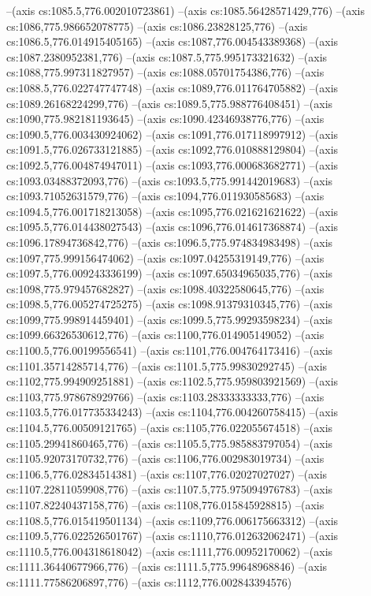 --(axis cs:1085.5,776.002010723861)
--(axis cs:1085.56428571429,776)
--(axis cs:1086,775.986652078775)
--(axis cs:1086.23828125,776)
--(axis cs:1086.5,776.014915405165)
--(axis cs:1087,776.004543389368)
--(axis cs:1087.2380952381,776)
--(axis cs:1087.5,775.995173321632)
--(axis cs:1088,775.997311827957)
--(axis cs:1088.05701754386,776)
--(axis cs:1088.5,776.022747747748)
--(axis cs:1089,776.011764705882)
--(axis cs:1089.26168224299,776)
--(axis cs:1089.5,775.988776408451)
--(axis cs:1090,775.982181193645)
--(axis cs:1090.42346938776,776)
--(axis cs:1090.5,776.003430924062)
--(axis cs:1091,776.017118997912)
--(axis cs:1091.5,776.026733121885)
--(axis cs:1092,776.010888129804)
--(axis cs:1092.5,776.004874947011)
--(axis cs:1093,776.000683682771)
--(axis cs:1093.03488372093,776)
--(axis cs:1093.5,775.991442019683)
--(axis cs:1093.71052631579,776)
--(axis cs:1094,776.011930585683)
--(axis cs:1094.5,776.001718213058)
--(axis cs:1095,776.021621621622)
--(axis cs:1095.5,776.014438027543)
--(axis cs:1096,776.014617368874)
--(axis cs:1096.17894736842,776)
--(axis cs:1096.5,775.974834983498)
--(axis cs:1097,775.999156474062)
--(axis cs:1097.04255319149,776)
--(axis cs:1097.5,776.009243336199)
--(axis cs:1097.65034965035,776)
--(axis cs:1098,775.979457682827)
--(axis cs:1098.40322580645,776)
--(axis cs:1098.5,776.005274725275)
--(axis cs:1098.91379310345,776)
--(axis cs:1099,775.998914459401)
--(axis cs:1099.5,775.99293598234)
--(axis cs:1099.66326530612,776)
--(axis cs:1100,776.014905149052)
--(axis cs:1100.5,776.00199556541)
--(axis cs:1101,776.004764173416)
--(axis cs:1101.35714285714,776)
--(axis cs:1101.5,775.99830292745)
--(axis cs:1102,775.994909251881)
--(axis cs:1102.5,775.959803921569)
--(axis cs:1103,775.978678929766)
--(axis cs:1103.28333333333,776)
--(axis cs:1103.5,776.017735334243)
--(axis cs:1104,776.004260758415)
--(axis cs:1104.5,776.00509121765)
--(axis cs:1105,776.022055674518)
--(axis cs:1105.29941860465,776)
--(axis cs:1105.5,775.985883797054)
--(axis cs:1105.92073170732,776)
--(axis cs:1106,776.002983019734)
--(axis cs:1106.5,776.02834514381)
--(axis cs:1107,776.02027027027)
--(axis cs:1107.22811059908,776)
--(axis cs:1107.5,775.975094976783)
--(axis cs:1107.82240437158,776)
--(axis cs:1108,776.015845928815)
--(axis cs:1108.5,776.015419501134)
--(axis cs:1109,776.006175663312)
--(axis cs:1109.5,776.022526501767)
--(axis cs:1110,776.012632062471)
--(axis cs:1110.5,776.004318618042)
--(axis cs:1111,776.00952170062)
--(axis cs:1111.36440677966,776)
--(axis cs:1111.5,775.99648968846)
--(axis cs:1111.77586206897,776)
--(axis cs:1112,776.002843394576)
